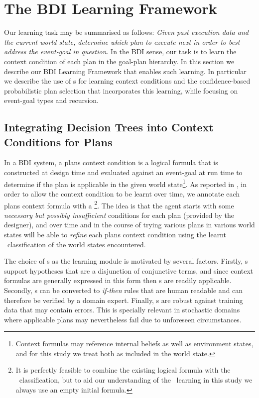 \section{The BDI Learning Framework}\label{sec:framework}

Our learning task may be summarised as follows: \textit{Given past execution data and the current world state, determine which plan to execute next in order to best address the event-goal in question}. In the BDI sense, our task is to learn the context condition of each plan in the goal-plan hierarchy. In this section we describe our BDI Learning Framework that enables such learning. In particular we describe the use of \dt s for learning context conditions and the confidence-based probabilistic plan selection that incorporates this learning, while focusing on event-goal types and recursion.

\subsection{Integrating Decision Trees into Context Conditions for Plans}

In a BDI system, a plans context condition is a logical formula that is constructed at design time and evaluated against an event-goal at run time to determine if the plan is applicable in the given world state\footnote{Context formulas may reference internal beliefs as well as environment states, and for this study we treat both as included in the world state.}. As reported in \cite{Airiau:IJAT:09}, in order to allow the context condition to be learnt over time, we annotate each plans context formula with a \textit{\dt}\footnote{It is perfectly feasible to combine the existing logical formula with the \dt\ classification, but to aid our understanding of the \dt\ learning in this study we always use an empty initial formula.}. The idea is that the agent starts with some \textit{necessary but possibly insufficient} conditions for each plan (provided by the designer), and over time and in the course of trying various plans in various world states will be able to \textit{refine} each plans context condition using the learnt \dt\ classification of the world states encountered.

The choice of \dt s as the learning module is motivated by several factors. Firstly, \dt s support hypotheses that are a disjunction of conjunctive terms, and since context formulas are generally expressed in this form then \dt s are readily applicable. Secondly, \dt s can be converted to \textit{if-then} rules that are human readable and can therefore be verified by a domain expert. Finally, \dt s are robust against training data that may contain errors. This is specially relevant in stochastic domains where applicable plans may nevertheless fail due to unforeseen circumstances.

